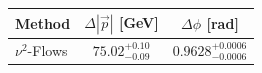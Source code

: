     \begin{tabular}{lcc}
        \toprule
        Method & $\Delta |\vec p|$ [GeV] & $\Delta \phi$ [rad] \\
        \midrule
        $\nu^2$-Flows & $75.02^{+0.10}_{-0.09}$ & $0.9628^{+0.0006}_{-0.0006}$ \\
        \bottomrule
    \end{tabular}
